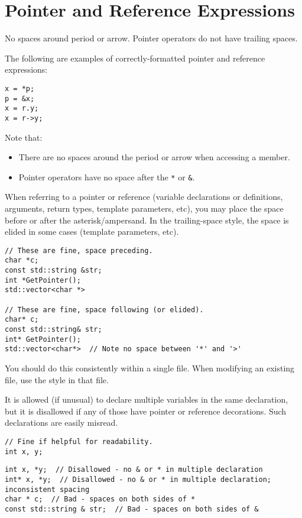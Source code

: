 
\section{Pointer and Reference Expressions}\label{sec:pointer-and-reference-expressions}
No spaces around period or arrow. Pointer operators do not have trailing spaces.

The following are examples of correctly-formatted pointer and reference expressions:
\begin{verbatim}
x = *p;
p = &x;
x = r.y;
x = r->y;
\end{verbatim}
Note that:
\begin{itemize}
    \item There are no spaces around the period or arrow when accessing a member.
    \item Pointer operators have no space after the \texttt{*} or \texttt{&}.
\end{itemize}
When referring to a pointer or reference (variable declarations or definitions, arguments, return types, template parameters, etc), you may place the space before or after the asterisk/ampersand. In the trailing-space style, the space is elided in some cases (template parameters, etc).
\begin{verbatim}
// These are fine, space preceding.
char *c;
const std::string &str;
int *GetPointer();
std::vector<char *>

// These are fine, space following (or elided).
char* c;
const std::string& str;
int* GetPointer();
std::vector<char*>  // Note no space between '*' and '>'
\end{verbatim}

You should do this consistently within a single file. When modifying an existing file, use the style in that file.

It is allowed (if unusual) to declare multiple variables in the same declaration, but it is disallowed if any of those have pointer or reference decorations. Such declarations are easily misread.
\begin{verbatim}
// Fine if helpful for readability.
int x, y;
\end{verbatim}

\begin{verbatim}
int x, *y;  // Disallowed - no & or * in multiple declaration
int* x, *y;  // Disallowed - no & or * in multiple declaration; inconsistent spacing
char * c;  // Bad - spaces on both sides of *
const std::string & str;  // Bad - spaces on both sides of &
\end{verbatim}
